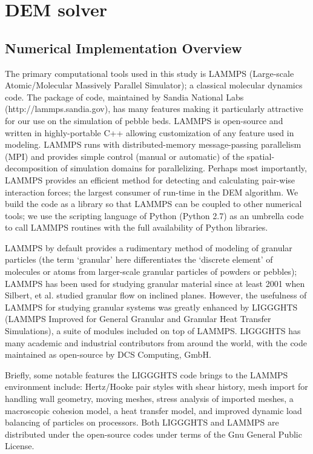 \section{DEM solver}\label{sec:dem-solver}

\subsection{Numerical Implementation Overview}

The primary computational tools used in this study is LAMMPS (Large-scale Atomic/Molecular Massively Parallel Simulator)\cite{Plimpton1995}; a classical molecular dynamics code. The package of code, maintained by Sandia National Labs (http://lammps.sandia.gov), has many features making it particularly attractive for our use on the simulation of pebble beds. LAMMPS is open-source and written in highly-portable C++ allowing customization of any feature used in modeling. LAMMPS runs with distributed-memory message-passing parallelism (MPI) and provides simple control (manual or automatic) of the spatial-decomposition of simulation domains for parallelizing. Perhaps most importantly, LAMMPS provides an efficient method for detecting and calculating pair-wise interaction forces; the largest consumer of run-time in the DEM algorithm\cite{Plimpton1995}. We build the code as a library so that LAMMPS can be coupled to other numerical tools; we use the scripting language of Python (Python 2.7) as an umbrella code to call LAMMPS routines with the full availability of Python libraries. 

LAMMPS by default provides a rudimentary method of modeling of granular particles (the term `granular' here differentiates the `discrete element' of molecules or atoms from larger-scale granular particles of powders or pebbles); LAMMPS has been used for studying granular material since at least 2001 when Silbert, et al.\cite{Silbert2001} studied granular flow on inclined planes. However, the usefulness of LAMMPS for studying granular systems was greatly enhanced by LIGGGHTS (LAMMPS Improved for General Granular and Granular Heat Transfer Simulations), a suite of modules included on top of LAMMPS. LIGGGHTS has many academic and industrial contributors from around the world, with the code maintained as open-source by DCS Computing, GmbH.

Briefly, some notable features the LIGGGHTS code brings to the LAMMPS environment include: Hertz/Hooke pair styles with shear history, mesh import for handling wall geometry, moving meshes, stress analysis of imported meshes, a macroscopic cohesion model, a heat transfer model, and improved dynamic load balancing of particles on processors\cite{Kloss2011}. Both LIGGGHTS and LAMMPS are distributed under the open-source codes under terms of the Gnu General Public License.

